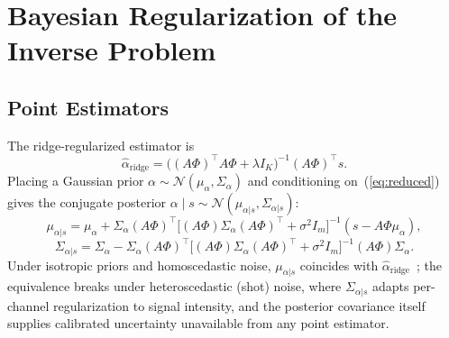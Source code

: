 \documentclass[11pt]{article}
\begin{document}
\section{Bayesian Regularization of the Inverse Problem}
\label{sec:bayes}

\subsection{Point Estimators}
\label{sec:estimators}

The ridge-regularized estimator is
\begin{equation}
\hat{\alpha}_{\mathrm{ridge}} = \big((A\Phi)^\top A\Phi + \lambda I_K\big)^{-1}(A\Phi)^\top s.
\label{eq:ridge}
\end{equation}
Placing a Gaussian prior $\alpha\sim\mathcal{N}(\mu_\alpha,\Sigma_\alpha)$ and conditioning on~(\ref{eq:reduced}) gives the conjugate posterior $\alpha\mid s\sim\mathcal{N}(\mu_{\alpha|s},\Sigma_{\alpha|s})$:
\begin{equation}
\mu_{\alpha|s} = \mu_\alpha + \Sigma_\alpha(A\Phi)^\top\big[(A\Phi)\Sigma_\alpha(A\Phi)^\top + \sigma^2 I_m\big]^{-1}(s - A\Phi\mu_\alpha),
\label{eq:bayesmean}
\end{equation}
\begin{equation}
\Sigma_{\alpha|s} = \Sigma_\alpha - \Sigma_\alpha(A\Phi)^\top\big[(A\Phi)\Sigma_\alpha(A\Phi)^\top + \sigma^2 I_m\big]^{-1}(A\Phi)\Sigma_\alpha.
\label{eq:bayescov}
\end{equation}
Under isotropic priors and homoscedastic noise, $\mu_{\alpha|s}$ coincides with $\hat{\alpha}_{\mathrm{ridge}}$~\citep{ref4}; the equivalence breaks under heteroscedastic (shot) noise, where $\Sigma_{\alpha|s}$ adapts per-channel regularization to signal intensity, and the posterior covariance itself supplies calibrated uncertainty unavailable from any point estimator.
\end{document}

